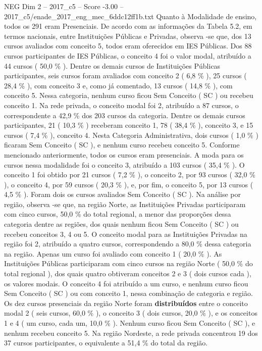 \begin{textsample}{NEG Dim 2 – 2017\_c5 – Score -3.00 – 2017\_c5/enade\_2017\_eng\_mec\_6ddc12ff1b.txt}
Quanto à Modalidade de ensino, todos os 291 eram Presenciais.
De acordo com as informações da Tabela 5.2, em termos nacionais, entre Instituições Públicas e Privadas, observa -se que, dos 13 cursos avaliados com conceito 5, todos eram oferecidos em IES Públicas.
Dos 88 cursos participantes de IES Públicas, o conceito 4 foi o valor modal, atribuído a 44 cursos ( 50,0 \% ).
Dentre os demais cursos de Instituições Públicas participantes, seis cursos foram avaliados com conceito 2 ( 6,8 \% ), 25 cursos ( 28,4 \% ), com conceito 3 e, como já comentado, 13 cursos ( 14,8 \% ), com conceito 5.
Nessa categoria, nenhum curso ficou Sem Conceito ( SC ) ou recebeu conceito 1.
Na rede privada, o conceito modal foi 2, atribuído a 87 cursos, o correspondente a 42,9 \% dos 203 cursos da categoria.
Dentre os demais cursos participantes, 21 ( 10,3 \% ) receberam conceito 1, 78 ( 38,4 \% ), conceito 3, e 15 cursos ( 7,4 \% ), conceito 4.
Nesta Categoria Administrativa, dois cursos ( 1,0 \% ) ficaram Sem Conceito ( SC ), e nenhum curso recebeu conceito 5.
Conforme mencionado anteriormente, todos os cursos eram presenciais.
A moda para os cursos nessa modalidade foi o conceito 3, atribuído a 103 cursos ( 35,4 \% ).
O conceito 1 foi obtido por 21 cursos ( 7,2 \% ), o conceito 2, por 93 cursos ( 32,0 \% ), o conceito 4, por 59 cursos ( 20,3 \% ), e, por fim, o conceito 5, por 13 cursos ( 4,5 \% ).
Foram dois os cursos avaliados Sem Conceito ( SC ).
Na análise por região, observa -se que, na região Norte, as Instituições Privadas participaram com cinco cursos, 50,0 \% do total regional, a menor das proporções dessa categoria dentre as regiões, dos quais nenhum ficou Sem Conceito ( SC ) ou recebeu conceitos 3, 4 ou 5.
O conceito modal para as Instituições Privadas na região foi 2, atribuído a quatro cursos, correspondendo a 80,0 \% dessa categoria na região.
Apenas um curso foi avaliado com conceito 1 ( 20,0 \% ).
As Instituições Públicas participaram com cinco cursos na região Norte ( 50,0 \% do total regional ), dos quais quatro obtiveram conceitos 2 e 3 ( dois cursos cada ), os valores modais.
O conceito 4 foi atribuído a um curso, e nenhum curso ficou Sem Conceito ( SC ) ou com conceito 1, nessa combinação de categoria e região.
Os dez cursos presenciais da região Norte foram \textbf{distribuídos} entre o conceito modal 2 ( seis cursos, 60,0 \% ), o conceito 3 ( dois cursos, 20,0 \% ), e os conceitos 1 e 4 ( um curso, cada um, 10,0 \% ).
Nenhum curso ficou Sem Conceito ( SC ), e nenhum recebeu conceito 5.
Na região Nordeste, a rede privada concentrou 19 dos 37 cursos participantes, o equivalente a 51,4 \% do total da região.

\end{textsample}
